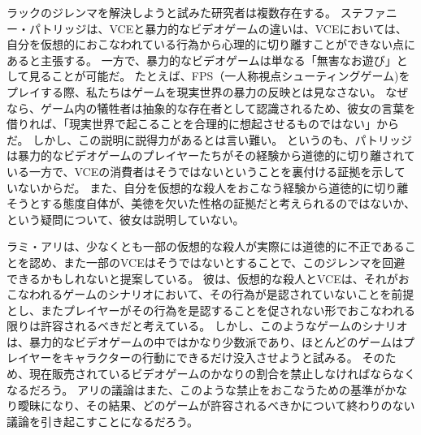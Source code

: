 \documentclass[paper=a4,book,openany]{jlreq}
\begin{document}
ラックのジレンマを解決しようと試みた研究者は複数存在する。
ステファニー・パトリッジは、VCEと暴力的なビデオゲームの違いは、VCEにおいては、自分を仮想的におこなわれている行為から心理的に切り離すことができない点にあると主張する。
一方で、暴力的なビデオゲームは単なる「無害なお遊び」として見ることが可能だ。
たとえば、FPS（一人称視点シューティングゲーム)をプレイする際、私たちはゲームを現実世界の暴力の反映とは見なさない。
なぜなら、ゲーム内の犠牲者は抽象的な存在者として認識されるため、彼女の言葉を借りれば、「現実世界で起こることを合理的に想起させるものではない」からだ\citep[p.33]{patridge13:_pornog_ethic_video_games}。
しかし、この説明に説得力があるとは言い難い。
というのも、パトリッジは暴力的なビデオゲームのプレイヤーたちがその経験から道徳的に切り離されている一方で、VCEの消費者はそうではないということを裏付ける証拠を示していないからだ。
また、自分を仮想的な殺人をおこなう経験から道徳的に切り離そうとする態度自体が、美徳を欠いた性格の証拠だと考えられるのではないか、という疑問について、彼女は説明していない。

ラミ・アリは、少なくとも一部の仮想的な殺人が実際には道徳的に不正であることを認め、また一部のVCEはそうではないとすることで、このジレンマを回避できるかもしれないと提案している。
彼は、仮想的な殺人とVCEは、それがおこなわれるゲームのシナリオにおいて、その行為が是認されていないことを前提とし、またプレイヤーがその行為を是認することを促されない形でおこなわれる限りは許容されるべきだと考えている\citep{ali15:_new_solut_gamer_dilem}。
しかし、このようなゲームのシナリオは、暴力的なビデオゲームの中ではかなり少数派であり、ほとんどのゲームはプレイヤーをキャラクターの行動にできるだけ没入させようと試みる。
そのため、現在販売されているビデオゲームのかなりの割合を禁止しなければならなくなるだろう。
アリの議論はまた、このような禁止をおこなうための基準がかなり曖昧になり、その結果、どのゲームが許容されるべきかについて終わりのない議論を引き起こすことになるだろう。
\end{document}
